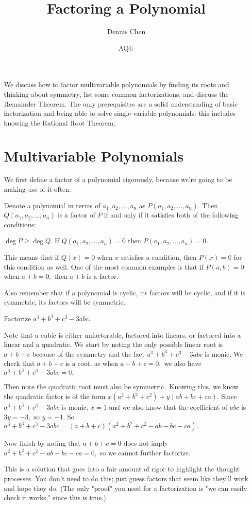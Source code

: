 \documentclass{article}
\title{Factoring a Polynomial}
\author{Dennis Chen}
\date{AQU}
\begin{document}
\maketitle
We discuss how to factor multivariable polynomials by finding its roots and thinking about symmetry, list some common factorizations, and discuss the Remainder Theorem. The only prerequisites are a solid understanding of basic factorization and being able to solve single-variable polynomials: this includes knowing the Rational Root Theorem.

\section{Multivariable Polynomials}
We first define a factor of a polynomial rigorously, because we're going to be making use of it often.

\begin{defi}
Denote a polynomial in terms of $a_1,a_2,\ldots,a_n$ as $P(a_1,a_2,\ldots,a_n).$ Then $Q(a_1,a_2,\ldots,a_n)$ is a factor of $P$ if and only if it satisfies both of the following conditions:
\begin{itemize}
     \Item $\deg P\geq \deg Q.$
     \Item If $Q(a_1,a_2,\ldots,a_n)=0$ then $P(a_1,a_2,\ldots,a_n)=0.$
\end{itemize}
\end{defi}
This means that if $Q(x)=0$ when $x$ satisfies a condition, then $P(x)=0$ for this condition as well. One of the most common examples is that if $P(a,b)=0$ when $a+b=0,$ then $a+b$ is a factor.

Also remember that if a polynomial is cyclic, its factors will be cyclic, and if it is symmetric, its factors will be symmetric.

\begin{exam}
Factorize $a^3+b^3+c^3-3abc.$
\end{exam}

\begin{sol}
Note that a cubic is either unfactorable, factored into linears, or factored into a linear and a quadratic. We start by noting the only possible linear root is $a+b+c$ because of the symmetry and the fact $a^3+b^3+c^3-3abc$ is monic. We check that $a+b+c$ is a root, as when $a+b+c=0,$ we also have $a^3+b^3+c^3-3abc=0.$

Then note the quadratic root must also be symmetric.\footnotemark\, Knowing this, we know the quadratic factor is of the form $x(a^2+b^2+c^2)+y(ab+bc+ca).$ Since $a^3+b^3+c^3-3abc$ is monic, $x=1$ and we also know that the coefficient of $abc$ is $3y=-3,$ so $y=-1.$ So $a^3+b^3+c^3-3abc=(a+b+c)(a^2+b^2+c^2-ab-bc-ca).$

Now finish by noting that $a+b+c=0$ does not imply $a^2+b^2+c^2-ab-bc-ca=0,$ so we cannot further factorize.
\end{sol}
This is a solution that goes into a fair amount of rigor to highlight the thought processes. You don't need to do this; just guess factors that seem like they'll work and hope they do. (The only "proof" you need for a factorization is "we can easily check it works," since this is true.)
\end{document}

